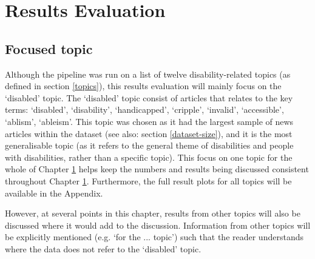 \documentclass{report}
\begin{document}



\chapter{Results Evaluation} \label{Results Evaluation}  %

\section{Focused topic} \label{Focused topic}
Although the pipeline was run on a list of twelve disability-related topics (as defined in section \ref{topics}), this results evaluation will mainly focus on the `disabled' topic.
The `disabled' topic consist of articles that relates to the key terms: `disabled', `disability', `handicapped', `cripple', `invalid', `accessible', `ablism', `ableism'.
This topic was chosen as it had the largest sample of news articles within the dataset (see also: section \ref{dataset-size}), and it is the most generalisable topic (as it refers to the general theme of disabilities and people with disabilities, rather than a specific topic).
This focus on one topic for the whole of Chapter \ref{Results Evaluation} helps keep the numbers and results being discussed consistent throughout Chapter \ref{Results Evaluation}.
Furthermore, the full result plots for all topics will be available in the Appendix.

However, at several points in this chapter, results from other topics will also be discussed where it would add to the discussion.
Information from other topics will be explicitly mentioned (e.g. `for the ... topic') such that the reader understands where the data does not refer to the `disabled' topic.
\end{document}
